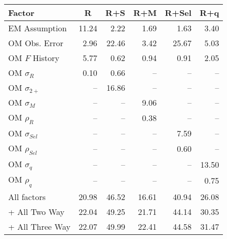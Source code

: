 \begin{center}
\begin{tabular}{lrrrrr}
\hline\hline
\multicolumn{1}{l}{Factor}&\multicolumn{1}{c}{R}&\multicolumn{1}{c}{R+S}&\multicolumn{1}{c}{R+M}&\multicolumn{1}{c}{R+Sel}&\multicolumn{1}{c}{R+q}\tabularnewline
\hline
EM Assumption&11.24& 2.22& 1.69& 1.63& 3.40\tabularnewline
OM Obs. Error& 2.96&22.46& 3.42&25.67& 5.03\tabularnewline
OM $F$ History& 5.77& 0.62& 0.94& 0.91& 2.05\tabularnewline
OM $\sigma_R$& 0.10& 0.66&--&--&--\tabularnewline
OM $\sigma_{2+}$ &--&16.86&--&--&--\tabularnewline
OM $\sigma_M$&--&--& 9.06&--&--\tabularnewline
OM $\rho_R$&--&--& 0.38&--&--\tabularnewline
OM $\sigma_{Sel}$&--&--&--& 7.59&--\tabularnewline
OM $\rho_{Sel}$&--&--&--& 0.60&--\tabularnewline
OM $\sigma_q$&--&--&--&--&13.50\tabularnewline
OM $\rho_q$&--&--&--&--& 0.75\tabularnewline
All factors&20.98&46.52&16.61&40.94&26.08\tabularnewline
+ All Two Way&22.04&49.25&21.71&44.14&30.35\tabularnewline
+ All Three Way&22.07&49.99&22.41&44.58&31.47\tabularnewline
\hline
\end{tabular}\end{center}
